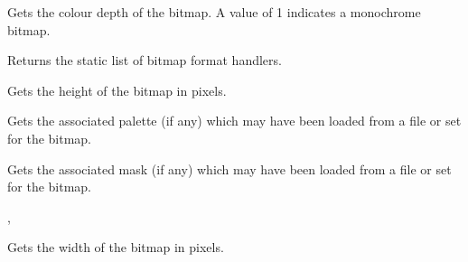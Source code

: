 

\label{wxbitmapgetdepth}


Gets the colour depth of the bitmap. A value of 1 indicates a
monochrome bitmap.

\label{wxbitmapgethandlers}


Returns the static list of bitmap format handlers.



\label{wxbitmapgetheight}


Gets the height of the bitmap in pixels.

\label{wxbitmapgetpalette}


Gets the associated palette (if any) which may have been loaded from a file
or set for the bitmap.



\label{wxbitmapgetmask}


Gets the associated mask (if any) which may have been loaded from a file
or set for the bitmap.


, 

\label{wxbitmapgetwidth}


Gets the width of the bitmap in pixels.



\label{wxbitmapgetsubbitmap}


